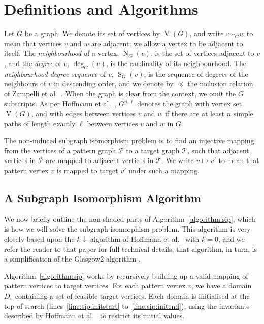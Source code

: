 \documentclass[a4paper,UKenglish]{lipics-v2018}
\newcommand{\neighbourhood}{\operatorname{N}}
\newcommand{\vertexset}{\operatorname{V}}
\newcommand{\nds}{\operatorname{S}}
\newcommand{\siplinerangeref}[2]{lines~\ref{line:sip:#1} to~\ref{line:sip:#2}}
\newcommand{\algorithmref}[1]{Algorithm~\ref{#1}}
\newcommand{\Algorithmref}[1]{Algorithm~\ref{#1}}
\begin{document}
\section{Definitions and Algorithms}

Let $G$ be a graph. We denote its set of vertices by $\vertexset(G)$, and write $v \sim_G w$ to mean
that vertices $v$ and $w$ are adjacent; we allow a vertex to be adjacent to itself. The
\emph{neighbourhood} of a vertex, $\neighbourhood_G(v)$, is the set of vertices adjacent to $v$, and
the \emph{degree} of $v$, $\deg_G(v)$, is the cardinality of its neighbourhood. The
\emph{neighbourhood degree sequence} of $v$, $\nds_G(v)$, is the sequence of degrees of the
neighbours of $v$ in descending order, and we denote by $\preceq$ the inclusion relation of
Zampelli et al.\ \cite{DBLP:journals/constraints/ZampelliDS10}. When the graph is clear from the context, we omit
the $G$ subscripts. As per Hoffmann et al.\ \cite{DBLP:conf/aaai/HoffmannMR17}, $G^{n,\ell}$ denotes the graph with
vertex set $\vertexset(G)$, and with edges between vertices $v$ and $w$ if there are at least $n$
simple paths of length exactly $\ell$ between vertices $v$ and $w$ in $G$.

The non-induced subgraph isomorphism problem is to find an injective mapping from the vertices of a
pattern graph $\mathcal{P}$ to a target graph $\mathcal{T}$, such that adjacent vertices in
$\mathcal{P}$ are mapped to adjacent vertices in $\mathcal{T}$. We write $v \mapsto v'$ to mean that
pattern vertex $v$ is mapped to target $v'$ under such a mapping.

\subsection{A Subgraph Isomorphism Algorithm}

We now briefly outline the non-shaded parts of \algorithmref{algorithm:sip}, which is how we will solve the
subgraph isomorphism problem. This algorithm is very closely based upon the $k{\downarrow}$
algorithm of Hoffmann et al.\ \cite{DBLP:conf/aaai/HoffmannMR17} with $k = 0$, and we refer the reader to that paper
for full technical details; that algorithm, in turn, is a simplification of the Glasgow2 algorithm
\cite{DBLP:conf/cp/McCreeshP15,DBLP:conf/lion/KotthoffMS16}.

\Algorithmref{algorithm:sip} works by recursively building up a valid mapping of pattern vertices to target
vertices. For each pattern vertex $v$, we have a domain $D_v$ containing a set of feasible target
vertices. Each domain is initialised at the top of search (\siplinerangeref{initstart}{initend}),
using the invariants described by Hoffmann et al.\ \cite{DBLP:conf/aaai/HoffmannMR17} to restrict its initial
values.
\end{document}
